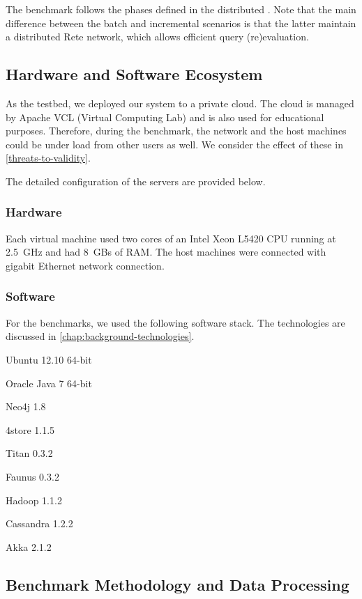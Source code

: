 The benchmark follows the phases defined in the distributed \tb{}. Note that the main difference between the batch and incremental scenarios is that the latter maintain a distributed Rete network, which allows efficient query (re)evaluation.

\subsection{Hardware and Software Ecosystem}
\label{ecosystem}

As the testbed, we deployed our system to a private cloud. The cloud is managed by Apache VCL (Virtual Computing Lab) and is also used for educational purposes. Therefore, during the benchmark, the network and the host machines could be under load from other users as well. We consider the effect of these in \autoref{threats-to-validity}.

The detailed configuration of the servers are provided below.

\subsubsection{Hardware}
 
Each virtual machine used two cores of an Intel Xeon L5420 CPU running at 2.5~GHz and had 8~GBs of RAM. The host machines were connected with gigabit Ethernet network connection.

\subsubsection{Software}

For the benchmarks, we used the following software stack. The technologies are discussed in \autoref{chap:background-technologies}.

\begin{itemize*}
  \item Ubuntu 12.10 64-bit
  \item Oracle Java 7 64-bit
  \item Neo4j 1.8
  \item 4store 1.1.5
  \item Titan 0.3.2
  \item Faunus 0.3.2
  \item Hadoop 1.1.2
  \item Cassandra 1.2.2
  \item Akka 2.1.2
\end{itemize*}

\subsection{Benchmark Methodology and Data Processing}
\label{benchmark-methodology}

